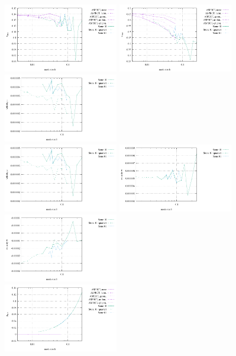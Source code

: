 \begin{center}
\includegraphics[width=5cm]{images/stokes_sphere3D/vrms_OT}
\includegraphics[width=5cm]{images/stokes_sphere3D/max_vel_OT}
\includegraphics[width=5cm]{images/stokes_sphere3D/max_u_OT}\\
\includegraphics[width=5cm]{images/stokes_sphere3D/max_v_OT}
\includegraphics[width=5cm]{images/stokes_sphere3D/max_w_OT}
\includegraphics[width=5cm]{images/stokes_sphere3D/min_w_OT}\\
\includegraphics[width=5cm]{images/stokes_sphere3D/pressure_min_OT}

\end{center}

